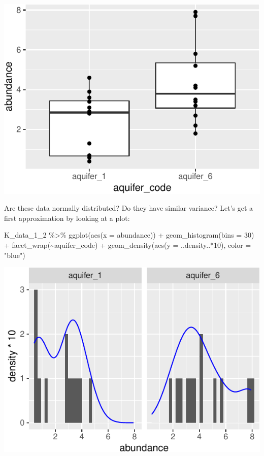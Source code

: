 \documentclass[
]{krantz}
\newenvironment{Shaded}{\begin{snugshade}}{\end{snugshade}}
\newcommand{\AttributeTok}[1]{\textcolor[rgb]{0.77,0.63,0.00}{#1}}
\newcommand{\DecValTok}[1]{\textcolor[rgb]{0.00,0.00,0.81}{#1}}
\newcommand{\FunctionTok}[1]{\textcolor[rgb]{0.00,0.00,0.00}{#1}}
\newcommand{\NormalTok}[1]{#1}
\newcommand{\SpecialCharTok}[1]{\textcolor[rgb]{0.00,0.00,0.00}{#1}}
\newcommand{\StringTok}[1]{\textcolor[rgb]{0.31,0.60,0.02}{#1}}
\begin{document}
\begin{center}\includegraphics[width=0.8\linewidth]{index_files/figure-latex/unnamed-chunk-137-1} \end{center}

Are these data normally distributed? Do they have similar variance? Let's get a first approximation by looking at a plot:

\begin{Shaded}
\begin{Highlighting}[]
\NormalTok{K\_data\_1\_2 }\SpecialCharTok{\%\textgreater{}\%}
  \FunctionTok{ggplot}\NormalTok{(}\FunctionTok{aes}\NormalTok{(}\AttributeTok{x =}\NormalTok{ abundance)) }\SpecialCharTok{+} 
    \FunctionTok{geom\_histogram}\NormalTok{(}\AttributeTok{bins =} \DecValTok{30}\NormalTok{) }\SpecialCharTok{+}
    \FunctionTok{facet\_wrap}\NormalTok{(}\SpecialCharTok{\textasciitilde{}}\NormalTok{aquifer\_code) }\SpecialCharTok{+}
    \FunctionTok{geom\_density}\NormalTok{(}\FunctionTok{aes}\NormalTok{(}\AttributeTok{y =}\NormalTok{ ..density..}\SpecialCharTok{*}\DecValTok{10}\NormalTok{), }\AttributeTok{color =} \StringTok{"blue"}\NormalTok{)}
\end{Highlighting}
\end{Shaded}

\begin{center}\includegraphics[width=0.8\linewidth]{index_files/figure-latex/unnamed-chunk-138-1} \end{center}
\end{document}

